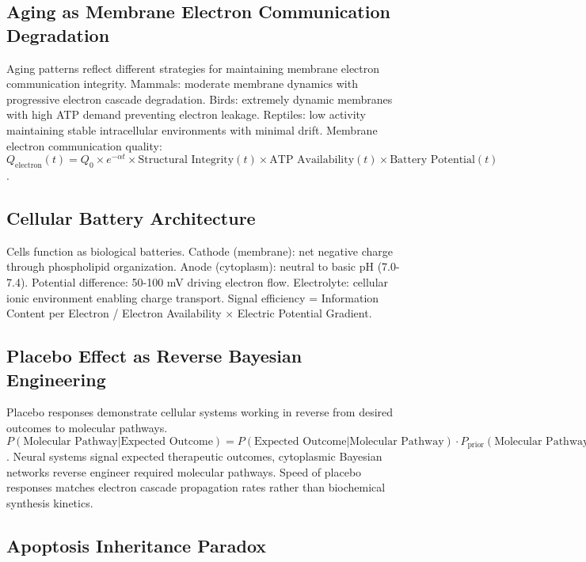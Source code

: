 \documentclass[12pt,a4paper]{article}
\begin{document}
\subsection{Aging as Membrane Electron Communication Degradation}

Aging patterns reflect different strategies for maintaining membrane electron communication integrity. Mammals: moderate membrane dynamics with progressive electron cascade degradation. Birds: extremely dynamic membranes with high ATP demand preventing electron leakage. Reptiles: low activity maintaining stable intracellular environments with minimal drift. Membrane electron communication quality: $Q_{\text{electron}}(t) = Q_0 \times e^{-\alpha t} \times \text{Structural Integrity}(t) \times \text{ATP Availability}(t) \times \text{Battery Potential}(t)$.

\subsection{Cellular Battery Architecture}

Cells function as biological batteries. Cathode (membrane): net negative charge through phospholipid organization. Anode (cytoplasm): neutral to basic pH (7.0-7.4). Potential difference: 50-100 mV driving electron flow. Electrolyte: cellular ionic environment enabling charge transport. Signal efficiency = Information Content per Electron / Electron Availability $\times$ Electric Potential Gradient.

\subsection{Placebo Effect as Reverse Bayesian Engineering}

Placebo responses demonstrate cellular systems working in reverse from desired outcomes to molecular pathways. $P(\text{Molecular Pathway}|\text{Expected Outcome}) = P(\text{Expected Outcome}|\text{Molecular Pathway}) \cdot P_{\text{prior}}(\text{Molecular Pathway}) / P(\text{Expected Outcome})$. Neural systems signal expected therapeutic outcomes, cytoplasmic Bayesian networks reverse engineer required molecular pathways. Speed of placebo responses matches electron cascade propagation rates rather than biochemical synthesis kinetics.

\subsection{Apoptosis Inheritance Paradox}
\end{document}
